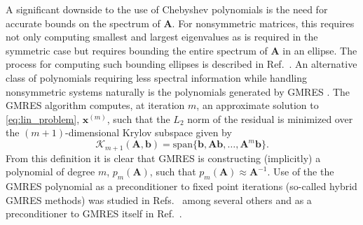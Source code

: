 \documentclass[10pt]{article}
\newcommand{\bx}{\ensuremath{\mathbf{x}}}
\newcommand{\bb}{\ensuremath{\mathbf{b}}}
\newcommand{\bA}{\ensuremath{\mathbf{A}}}
\newcommand{\calK}{\ensuremath{\mathcal{K}}}
\begin{document}
A significant downside to the use of Chebyshev polynomials is the need for
accurate bounds on the spectrum of $\bA$.  For nonsymmetric matrices,
this requires not only computing smallest and largest eigenvalues as is
required in the symmetric case but requires
bounding the entire spectrum of $\bA$ in an ellipse.  The process for
computing such bounding ellipses is described in Ref.~\cite{manteuffel_77}.
An alternative class of polynomials requiring less spectral information
while handling nonsymmetric systems naturally is the polynomials generated
by GMRES \cite{saad_86}.  The GMRES algorithm computes, at iteration $m$,
an approximate solution to \eqref{eq:lin_problem}, $\bx^{(m)}$,
such that the $L_2$ norm of the residual
is minimized over the $(m+1)$-dimensional Krylov subspace given by
\begin{equation}
\calK_{m+1}(\bA,\bb) = \text{span}\{ \bb, \bA \bb, \ldots, \bA^{m} \bb \}.
\end{equation}
From this definition it is clear that GMRES is constructing (implicitly)
a polynomial of degree $m$, $p_m(\bA)$, such that $p_m(\bA) \approx \bA^{-1}$.
Use of the the GMRES polynomial as a preconditioner to fixed point iterations
(so-called hybrid GMRES methods)
was studied in Refs.~\cite{nachtigal_92,joubert_94} among several others
and as a preconditioner to {GMRES} itself in Ref.~\cite{liu_14}.
\end{document}
